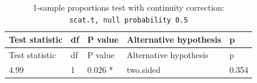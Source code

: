 \documentclass[]{tufte-handout}
\newenvironment{Shaded}{}{}
\newcommand{\KeywordTok}[1]{\textbf{{#1}}}
\newcommand{\StringTok}[1]{{#1}}
\newcommand{\NormalTok}[1]{{#1}}
\begin{document}
\begin{Shaded}
\end{Shaded}

\begin{longtable}[]{@{}lllll@{}}
\caption{1-sample proportions test with continuity correction:
\texttt{scat.t,\ null\ probability\ 0.5}}\tabularnewline
\toprule
\begin{minipage}[b]{0.20\columnwidth}\raggedright\strut
Test statistic\strut
\end{minipage} & \begin{minipage}[b]{0.06\columnwidth}\raggedright\strut
df\strut
\end{minipage} & \begin{minipage}[b]{0.12\columnwidth}\raggedright\strut
P value\strut
\end{minipage} & \begin{minipage}[b]{0.30\columnwidth}\raggedright\strut
Alternative hypothesis\strut
\end{minipage} & \begin{minipage}[b]{0.08\columnwidth}\raggedright\strut
p\strut
\end{minipage}\tabularnewline
\midrule
\endfirsthead
\toprule
\begin{minipage}[b]{0.20\columnwidth}\raggedright\strut
Test statistic\strut
\end{minipage} & \begin{minipage}[b]{0.06\columnwidth}\raggedright\strut
df\strut
\end{minipage} & \begin{minipage}[b]{0.12\columnwidth}\raggedright\strut
P value\strut
\end{minipage} & \begin{minipage}[b]{0.30\columnwidth}\raggedright\strut
Alternative hypothesis\strut
\end{minipage} & \begin{minipage}[b]{0.08\columnwidth}\raggedright\strut
p\strut
\end{minipage}\tabularnewline
\midrule
\endhead
\begin{minipage}[t]{0.20\columnwidth}\raggedright\strut
4.99\strut
\end{minipage} & \begin{minipage}[t]{0.06\columnwidth}\raggedright\strut
1\strut
\end{minipage} & \begin{minipage}[t]{0.12\columnwidth}\raggedright\strut
0.026 *\strut
\end{minipage} & \begin{minipage}[t]{0.30\columnwidth}\raggedright\strut
two.sided\strut
\end{minipage} & \begin{minipage}[t]{0.08\columnwidth}\raggedright\strut
0.354\strut
\end{minipage}\tabularnewline
\bottomrule
\end{longtable}
\end{document}
